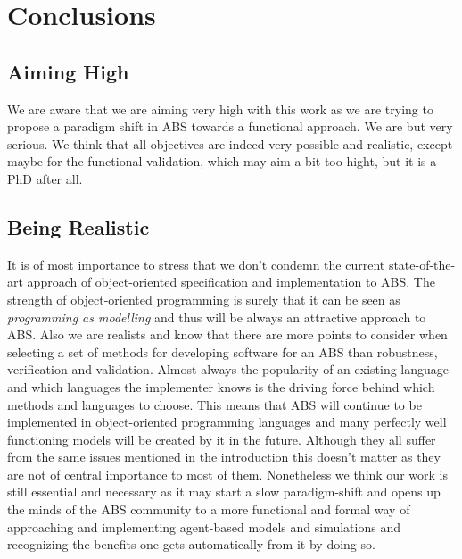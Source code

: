 \chapter{Conclusions}
\label{chap:concl}


\section{Aiming High}
We are aware that we are aiming very high with this work as we are trying to propose a paradigm shift in ABS towards a functional approach. We are but very serious. We think that all objectives are indeed very possible and realistic, except maybe for the functional validation, which may aim a bit too hight, but it is a PhD after all. 

\section{Being Realistic}
It is of most importance to stress that we don't condemn the current state-of-the-art approach of object-oriented specification and implementation to ABS. The strength of object-oriented programming is surely that it can be seen as \textit{programming as modelling} and thus will be always an attractive approach to ABS. Also we are realists and know that there are more points to consider when selecting a set of methods for developing software for an ABS than robustness, verification and validation. Almost always the popularity of an existing language and which languages the implementer knows is the driving force behind which methods and languages to choose. This means that ABS will continue to be implemented in object-oriented programming languages and many perfectly well functioning models will be created by it in the future. Although they all suffer from the same issues mentioned in the introduction this doesn't matter as they are not of central importance to most of them.
Nonetheless we think our work is still essential and necessary as it may start a slow paradigm-shift and opens up the minds of the ABS community to a more functional and formal way of approaching and implementing agent-based models and simulations and recognizing the benefits one gets automatically from it by doing so.